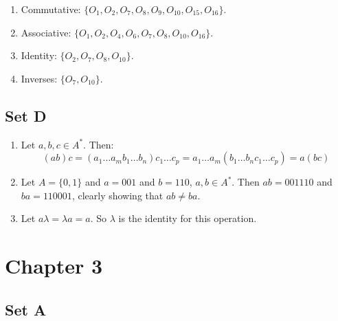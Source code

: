\documentclass{article}
\begin{document}
\begin{enumerate}
    \item Commutative: $\{O_1, O_2, O_7, O_8, O_9, O_{10}, O_{15}, O_{16}\}$.
    \item Associative: $\{O_1, O_2, O_4, O_6, O_7, O_8, O_{10}, O_{16}\}$.
    \item Identity: $\{O_2, O_7, O_8, O_{10}\}$.
    \item Inverses: $\{O_7, O_{10}\}$.
\end{enumerate}

\subsection*{Set D}
\begin{enumerate}
    \item Let $a, b, c \in A^*$. Then:
        $$(ab)c = (a_1\ldots a_mb_1\ldots b_n)c_1\ldots c_p = a_1\ldots a_m(b_1\ldots b_nc_1\ldots c_p) = a(bc)$$
    \item Let $A = \{0, 1\}$ and $a = 001$ and $b = 110$, $a, b \in A^*$. Then $ab = 001110$ and $ba = 110001$, clearly showing that $ab \ne ba$.
    \item Let $a\lambda = \lambda a = a$. So $\lambda$ is the identity for this operation.
\end{enumerate}

\section*{Chapter 3}

\subsection*{Set A}
\end{document}

